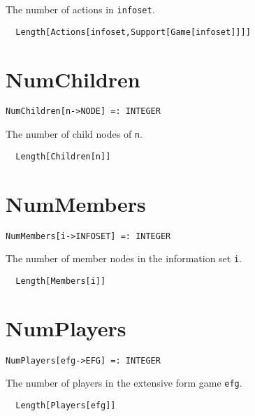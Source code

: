 \noindent
The number of actions in  \verb+infoset+.

\udfbody
\begin{verbatim}
  Length[Actions[infoset,Support[Game[infoset]]]] 
\end{verbatim} 


\section*{NumChildren}\label{ExtNumChildren}
\begin{verbatim}
NumChildren[n->NODE] =: INTEGER 
\end{verbatim}

\noindent
The number of child nodes of \verb+n+.

\udfbody
\begin{verbatim}
  Length[Children[n]]
\end{verbatim} 


\section*{NumMembers}\label{ExtNumMembers}
\begin{verbatim}
NumMembers[i->INFOSET] =: INTEGER 
\end{verbatim}

\noindent
The number of member nodes in the information set \verb+i+.

\udfbody
\begin{verbatim}
  Length[Members[i]]
\end{verbatim} 


\section*{NumPlayers}\label{ExtNumPlayers}
\begin{verbatim}
NumPlayers[efg->EFG] =: INTEGER 
\end{verbatim}

\noindent
The number of players in the extensive form game \verb+efg+.

\udfbody
\begin{verbatim}
  Length[Players[efg]]
\end{verbatim} 

